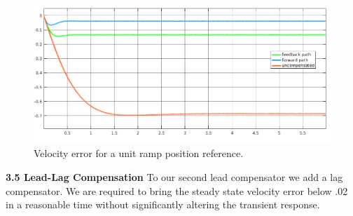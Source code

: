 \documentclass[11pt,a4paper]{article}
\begin{document}
\begin{figure}[!htbp]
	\includegraphics[width=\textwidth]{imglab/lab4sol_ramperrleadhighgain.png}
	\caption{Velocity error for a unit ramp position reference.}
\end{figure}

\textbf{3.5 Lead-Lag Compensation}
To our second lead compensator we add a lag compensator. We are required to bring the steady state velocity error below .02 in a reasonable time without significantly altering the transient response.
\end{document}
